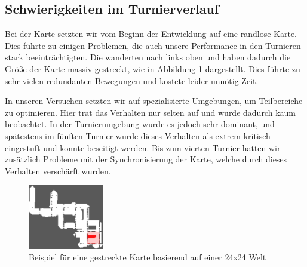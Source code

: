 \subsection{Schwierigkeiten im Turnierverlauf}
Bei der Karte setzten wir vom Beginn der Entwicklung auf eine randlose Karte. Dies führte zu einigen Problemen, die auch unsere Performance in den Turnieren stark beeinträchtigten. Die \Agents wanderten nach links oben und haben dadurch die Größe der Karte massiv gestreckt, wie in Abbildung \ref{fig:kartenwiederholung} dargestellt. Dies führte zu sehr vielen redundanten Bewegungen und kostete leider unnötig Zeit. 

In unseren Versuchen setzten wir auf spezialisierte Umgebungen, um Teilbereiche zu optimieren. Hier trat das Verhalten nur selten auf und wurde dadurch kaum beobachtet. In der Turnierumgebung wurde es jedoch sehr dominant, und spätestens im fünften Turnier wurde dieses Verhalten als extrem kritisch eingestuft und konnte beseitigt werden. Bis zum vierten Turnier hatten wir zusätzlich Probleme mit der Synchronisierung der Karte, welche durch dieses Verhalten verschärft wurden. \newline

\begin{figure}
	\includegraphics[width=125px]{bilder/karte3.png}
	\centering
	\caption{Beispiel für eine gestreckte Karte basierend auf einer 24x24 Welt }
	\label{fig:kartenwiederholung}
\end{figure}
